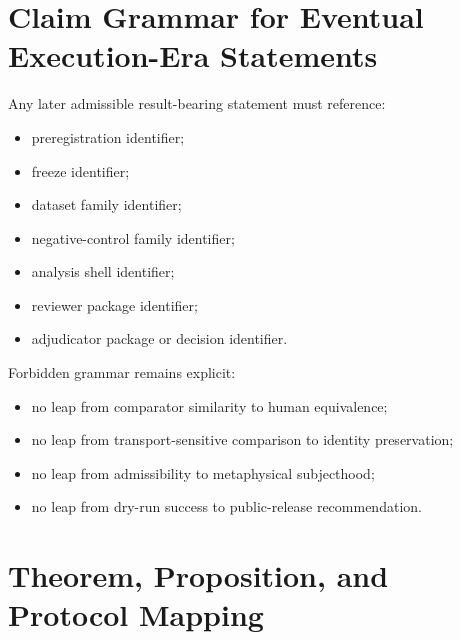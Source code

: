 \documentclass[11pt,a4paper]{article}
\begin{document}
\section{Claim Grammar for Eventual Execution-Era Statements}

Any later admissible result-bearing statement must reference:

\begin{itemize}
\item preregistration identifier;
\item freeze identifier;
\item dataset family identifier;
\item negative-control family identifier;
\item analysis shell identifier;
\item reviewer package identifier;
\item adjudicator package or decision identifier.
\end{itemize}

Forbidden grammar remains explicit:

\begin{itemize}
\item no leap from comparator similarity to human equivalence;
\item no leap from transport-sensitive comparison to identity preservation;
\item no leap from admissibility to metaphysical subjecthood;
\item no leap from dry-run success to public-release recommendation.
\end{itemize}

\section{Theorem, Proposition, and Protocol Mapping}
\end{document}
